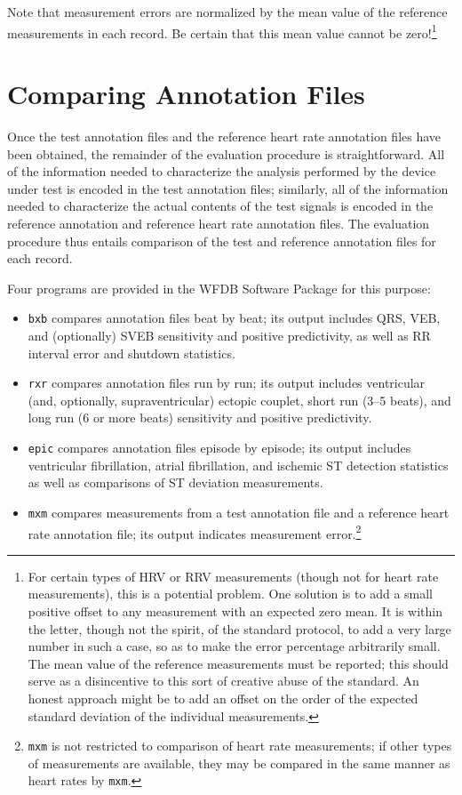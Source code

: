\documentclass[twoside]{article}
\begin{document}
Note that measurement errors are normalized by the mean value of the reference
measurements in each record.  Be certain that this mean value cannot be
zero!\footnote{
For certain types of HRV or RRV measurements (though not for heart rate
measurements), this is a potential problem.  One solution is to add a small
positive offset to any measurement with an expected zero mean.  It is within
the letter, though not the spirit, of the standard protocol, to add a
very large number in such a case, so as to make the error percentage
arbitrarily small.  The mean value of the reference measurements must be
reported; this should serve as a disincentive to this sort of creative abuse
of the standard.  An honest approach might be to add an offset on the order of
the expected standard deviation of the individual measurements.}

\section{Comparing Annotation Files}

Once the test annotation files and the reference heart rate annotation files
have been obtained, the remainder of the evaluation procedure is
straightforward.  All of the information needed to characterize the analysis
performed by the device under test is encoded in the test annotation files;
similarly, all of the information needed to characterize the actual contents
of the test signals is encoded in the reference annotation and reference
heart rate annotation files.  The evaluation procedure thus entails comparison
of the test and reference annotation files for each record.

Four programs are provided in the WFDB Software Package for this purpose:
\begin{itemize}
   \item {\tt bxb} compares annotation files beat by beat; its output
includes QRS, VEB, and (optionally) SVEB sensitivity and positive
predictivity, as well as RR interval error and shutdown statistics.

   \item {\tt rxr} compares annotation files run by run; its output
includes ventricular (and, optionally, supraventricular) ectopic couplet, short
run (3--5 beats), and long run (6 or more beats) sensitivity and positive
predictivity.

   \item {\tt epic} compares annotation files episode by episode; its
output includes ventricular fibrillation, atrial fibrillation, and ischemic ST
detection statistics as well as comparisons of ST deviation measurements.

   \item {\tt mxm} compares measurements from a test annotation
file and a reference heart rate annotation file;  its output indicates
measurement error.\footnote{
{\tt mxm} is not restricted to comparison of heart rate measurements;  if
other types of measurements are available, they may be compared in the same
manner as heart rates by {\tt mxm}.}
\end{itemize}
\end{document}
